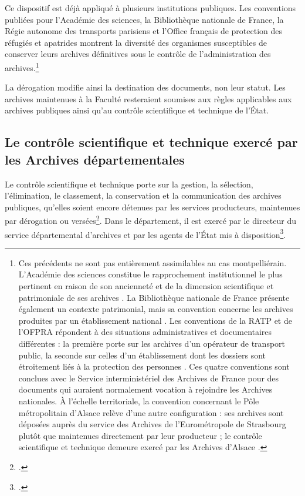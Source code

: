 Ce dispositif est déjà appliqué à plusieurs institutions publiques. Les conventions publiées pour l'Académie des sciences, la Bibliothèque nationale de France, la Régie autonome des transports parisiens et l'Office français de protection des réfugiés et apatrides montrent la diversité des organismes susceptibles de conserver leurs archives définitives sous le contrôle de l'administration des archives.\footnote{Ces précédents ne sont pas entièrement assimilables au cas montpelliérain. L'Académie des sciences constitue le rapprochement institutionnel le plus pertinent en raison de son ancienneté et de la dimension scientifique et patrimoniale de ses archives \parencite{ConventionAcademieSciences2024}. La Bibliothèque nationale de France présente également un contexte patrimonial, mais sa convention concerne les archives produites par un établissement national \parencite{ConventionBnF2025}. Les conventions de la RATP et de l'OFPRA répondent à des situations administratives et documentaires différentes : la première porte sur les archives d'un opérateur de transport public, la seconde sur celles d'un établissement dont les dossiers sont étroitement liés à la protection des personnes \parencite{ConventionRATP2023,ConventionOFPRA2025}. Ces quatre conventions sont conclues avec le Service interministériel des Archives de France pour des documents qui auraient normalement vocation à rejoindre les Archives nationales. À l'échelle territoriale, la convention concernant le Pôle métropolitain d'Alsace relève d'une autre configuration : ses archives sont déposées auprès du service des Archives de l'Eurométropole de Strasbourg plutôt que maintenues directement par leur producteur ; le contrôle scientifique et technique demeure exercé par les Archives d'Alsace \parencite{ConventionPMAEurometropole2024}.}

La dérogation modifie ainsi la destination des documents, non leur statut. Les archives maintenues à la Faculté resteraient soumises aux règles applicables aux archives publiques ainsi qu'au contrôle scientifique et technique de l'État.

\subsection{Le contrôle scientifique et technique exercé par les Archives départementales}

Le contrôle scientifique et technique porte sur la gestion, la sélection, l'élimination, le classement, la conservation et la communication des archives publiques, qu'elles soient encore détenues par les services producteurs, maintenues par dérogation ou versées\footcite[art.~R.~212-2 et R.~212-3]{CodePatrimoine}. Dans le département, il est exercé par le directeur du service départemental d'archives et par les agents de l'État mis à disposition\footcite[art.~R.~212-4]{CodePatrimoine}.

